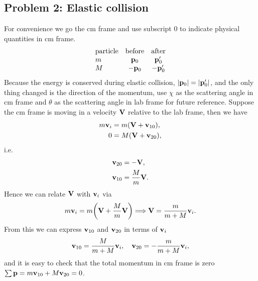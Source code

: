 \documentclass[10pt]{article}
\begin{document}
\subsection{Problem 2: Elastic collision}
For convenience we go the cm frame and use subscript 0 to indicate physical quantities in cm frame. 
\[
\begin{array}{lcc}
	\text{particle} & \text{before} & \text{after} \\
	m & \vb{p}_0 & \vb{p}'_0 \\
	M & -\vb{p}_0 & -\vb{p}'_0 
\end{array}
\] 
Because the energy is conserved during elastic collision, $\abs{\vb{p}_0} = \abs{\vb{p}'_0}$, and the only thing changed is the direction of the momentum, use $\chi$ as the scattering angle in cm frame and $\theta$ as the scattering angle in lab frame for future reference. Suppose the cm frame is moving in a velocity $\vb{V}$ relative to the lab frame, then we have 
\begin{align*}
	m \vb{v}_i &= m(\vb{V} + \vb{v}_{10}), \\
	0 &= M(\vb{V} + \vb{v}_{20}), \\
\end{align*}
i.e. 
\begin{align}
	\vb{v}_{20} &= -\vb{V}, \\
	\vb{v}_{10} &= \frac{M}{m} \vb{V}.
\end{align}
Hence we can relate $\vb{V}$ with $\vb{v}_i$ via 
\begin{equation}
	m \vb{v}_i = m\qty(\vb{V} + \frac{M}{m}\vb{V}) \Longrightarrow \vb{V} = \frac{m}{m + M} \vb{v}_i.
\end{equation}
From this we can express $\vb{v}_{10}$ and $\vb{v}_{20}$ in terms of $\vb{v}_i$ 
\begin{equation}
	\vb{v}_{10} = \frac{M}{m+M} \vb{v}_i\qc \vb{v}_{20} = -\frac{m}{m+M} \vb{v}_i,
\end{equation}
and it is easy to check that the total momentum in cm frame is zero $\sum \vb{p} = m \vb{v}_{10} + M \vb{v}_{20} = 0$.
\end{document}
